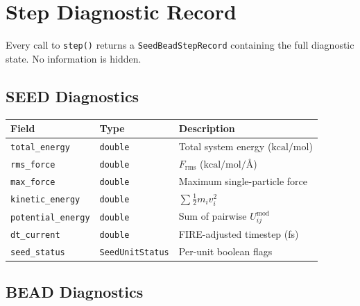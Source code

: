 \documentclass[11pt, a4paper, oneside]{article}
\newcommand{\type}[1]{\texttt{#1}}
\newcommand{\field}[1]{\texttt{#1}}
\newcommand{\Ang}{\text{\AA}}
\newcommand{\kcalmol}{\text{kcal/mol}}
\begin{document}
\newpage
\section{Step Diagnostic Record}
\label{sec:diagnostic-record}

Every call to \type{step()} returns a \type{SeedBeadStepRecord}
containing the full diagnostic state.  No information is hidden.

\subsection{SEED Diagnostics}
\label{sec:seed-diagnostics}

\begin{center}
\begin{tabular}{lll}
  \toprule
  \textbf{Field} & \textbf{Type} & \textbf{Description} \\
  \midrule
  \field{total\_energy}    & \texttt{double} & Total system energy ($\kcalmol$) \\
  \field{rms\_force}       & \texttt{double} & $F_{\text{rms}}$ ($\kcalmol/\Ang$) \\
  \field{max\_force}       & \texttt{double} & Maximum single-particle force \\
  \field{kinetic\_energy}  & \texttt{double} & $\sum \tfrac{1}{2}m_i v_i^2$ \\
  \field{potential\_energy} & \texttt{double} & Sum of pairwise $U_{ij}^{\text{mod}}$ \\
  \field{dt\_current}      & \texttt{double} & FIRE-adjusted timestep (fs) \\
  \field{seed\_status}     & \type{SeedUnitStatus} & Per-unit boolean flags \\
  \bottomrule
\end{tabular}
\end{center}

\subsection{BEAD Diagnostics}
\label{sec:bead-diagnostics}
\end{document}
